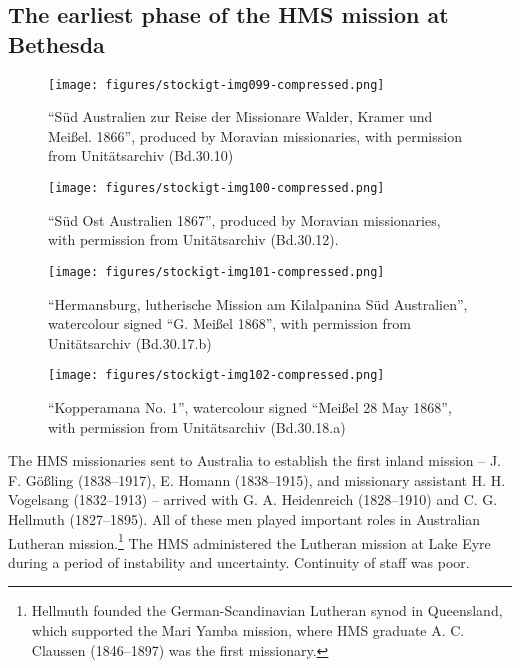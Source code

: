\subsection{The earliest phase of the HMS mission at Bethesda}
\label{sec:key:8.3.1}\label{bkm:Ref74134584}

\begin{figure}
\texttt{[image: figures/stockigt-img099-compressed.png]}
\caption{“Süd Australien zur Reise der Missionare Walder, Kramer und Meißel. 1866”, produced by Moravian missionaries, with permission from Unitätsarchiv (Bd.30.10)}
\label{bkm:Ref76478694}
\end{figure}

\begin{figure}
\texttt{[image: figures/stockigt-img100-compressed.png]}
\caption{“Süd Ost Australien 1867”, produced by Moravian missionaries, with permission from Unitätsarchiv (Bd.30.12).}
\label{bkm:Ref76478713}
\end{figure}

\begin{figure}
\texttt{[image: figures/stockigt-img101-compressed.png]}
\caption{“Hermansburg, lutherische Mission am Kilalpanina Süd Australien'', watercolour signed “G. Meißel 1868'', with permission from Unitätsarchiv (Bd.30.17.b)}
\label{bkm:Ref76480787}\label{fig:key:152}
\end{figure}


\begin{figure}
\texttt{[image: figures/stockigt-img102-compressed.png]}
\caption{“Kopperamana No. 1'', watercolour signed “Meißel 28 May 1868'', with permission from Unitätsarchiv (Bd.30.18.a)}
\label{bkm:Ref76480833}\label{fig:key:153}
\end{figure}


The HMS missionaries sent to Australia to establish the first inland mission – J. F. Gößling (1838–1917), E. Homann (1838–1915), and missionary assistant H. H. Vogelsang (1832–1913) – arrived with G. A. Heidenreich (1828–1910) and C. G. Hellmuth (1827–1895). All of these men played important roles in Australian Lutheran mission.\footnote{Hellmuth founded the German-Scandinavian Lutheran synod in Queensland, which supported the Mari Yamba mission, where HMS graduate A. C. Claussen (1846–1897) was the first missionary.}  The HMS administered the Lutheran mission at Lake Eyre during a period of instability and uncertainty. Continuity of staff was poor.


